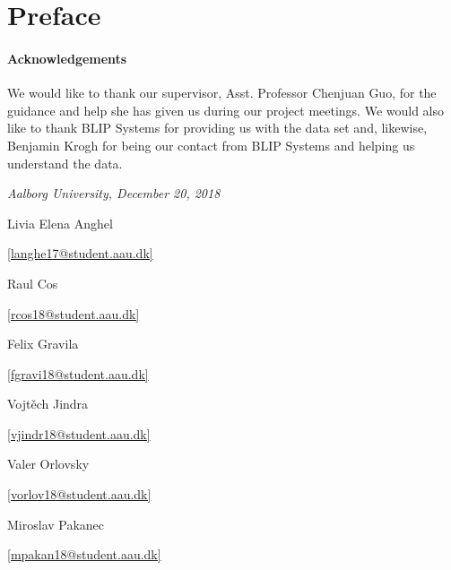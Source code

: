 \chapter*{Preface} \label{sec:forord}
\subsubsection*{Acknowledgements}
We would like to thank our supervisor, Asst. Professor Chenjuan Guo, for the guidance and help she has given us during our project meetings. We would also like to thank BLIP Systems for providing us with the data set and, likewise, Benjamin Krogh for being our contact from BLIP Systems and helping us understand the data.
\bigskip
\begin{flushright}
\textit{Aalborg University, December 20, 2018}
\end{flushright}
\newcommand*\signatureline[2]{\vspace*{2cm}\parbox{5cm}{
    \begin{center}
        \hrulefill\par#1\par#2
    \end{center}
    }
}
\newcommand*\mailto[1]{\href{mailto:#1}{[#1]}}

\begingroup
  \centering
  \signatureline{Livia Elena Anghel}{\mailto{langhe17@student.aau.dk}}
  \hspace{1cm}
  \signatureline{Raul Cos}{\mailto{rcos18@student.aau.dk}}
  \hspace{1cm}
  \signatureline{Felix Gravila}{\mailto{fgravi18@student.aau.dk}}
  \vspace{1cm}
  \signatureline{Vojtěch Jindra}{\mailto{vjindr18@student.aau.dk}}
  \hspace{1cm}
  \signatureline{Valer Orlovsky}{\mailto{vorlov18@student.aau.dk}}
  \hspace{1cm}
  \signatureline{Miroslav Pakanec}{\mailto{mpakan18@student.aau.dk}}
\endgroup

\clearpage
